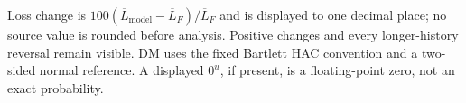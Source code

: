 \noindent\begin{minipage}{0.98\linewidth}\scriptsize Loss change is $100(\overline L_{\mathrm{model}}-\overline L_F)/\overline L_F$ and is displayed to one decimal place; no source value is rounded before analysis. Positive changes and every longer-history reversal remain visible. DM uses the fixed Bartlett HAC convention and a two-sided normal reference. A displayed $0^{u}$, if present, is a floating-point zero, not an exact probability.\end{minipage}\par\smallskip
\endgroup
